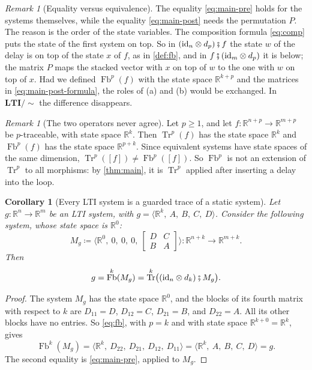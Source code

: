 \documentclass[11pt,a4paper]{article}
\theoremstyle{plain}
\newtheorem{corollary}[theorem]{Corollary}
\theoremstyle{definition}
\theoremstyle{remark}
\newtheorem{remark}[theorem]{Remark}
\DeclareMathOperator{\Fb}{Fb}
\DeclareMathOperator{\Tr}{Tr}
\newcommand{\R}{\mathbb{R}}
\newcommand{\id}{\mathrm{id}}
\newcommand{\then}{\mathbin{\fatsemi}}
\newcommand{\LTIq}{\mathbf{LTI}/{\sim}}
\newcommand{\sys}[5]{\bigl\langle #1,\ #2,\ #3,\ #4,\ #5 \bigr\rangle}
\begin{document}
\begin{remark}[Equality versus equivalence]
    The equality \cref{eq:main-pre} holds for the systems themselves, while the equality \cref{eq:main-post} needs the permutation $P$.
    The reason is the order of the state variables.
    The composition formula \cref{eq:comp} puts the state of the first system on top.
    So in $(\id_n \otimes d_p) \then f$ the state $w$ of the delay is on top of the state $x$ of $f$, as in \cref{def:fb}, and in $f \then (\id_m \otimes d_p)$ it is below; the matrix $P$ maps the stacked vector with $x$ on top of $w$ to the one with $w$ on top of $x$.
    Had we defined $\Fb^p(f)$ with the state space $\R^{k+p}$ and the matrices in \cref{eq:main-post-formula}, the roles of (a) and (b) would be exchanged.
    In $\LTIq$ the difference disappears.
\end{remark}

\begin{remark}[The two operators never agree]
    Let $p \geq 1$, and let $f \colon \R^{n+p} \to \R^{m+p}$ be $p$-traceable, with state space $\R^k$.
    Then $\Tr^p(f)$ has the state space $\R^k$ and $\Fb^p(f)$ has the state space $\R^{p+k}$.
    Since equivalent systems have state spaces of the same dimension, $\Tr^p([f]) \neq \Fb^p([f])$.
    So $\Fb^p$ is not an extension of $\Tr^p$ to all morphisms: by \cref{thm:main}, it is $\Tr^p$ applied after inserting a delay into the loop.
\end{remark}

\begin{corollary}[Every LTI system is a guarded trace of a static system]
    \label{cor:static}
    Let $g \colon \R^n \to \R^m$ be an LTI system, with $g = \sys{\R^k}{A}{B}{C}{D}$.
    Consider the following system, whose state space is $\R^0$:
    \begin{equation}
        M_g \coloneqq \sys{\R^0}{0}{0}{0}{\begin{bmatrix} D & C \\ B & A \end{bmatrix}} \colon \R^{n+k} \to \R^{m+k} .
    \end{equation}
    Then
    \begin{equation}
        g = \Fb^k(M_g) = \Tr^k\bigl( (\id_n \otimes d_k) \then M_g \bigr) .
    \end{equation}
\end{corollary}

\begin{proof}
    The system $M_g$ has the state space $\R^0$, and the blocks of its fourth matrix with respect to $k$ are $D_{11} = D$, $D_{12} = C$, $D_{21} = B$, and $D_{22} = A$.
    All its other blocks have no entries.
    So \cref{eq:fb}, with $p = k$ and with state space $\R^{k+0} = \R^k$, gives
    \begin{equation*}
        \Fb^k(M_g) = \sys{\R^k}{D_{22}}{D_{21}}{D_{12}}{D_{11}} = \sys{\R^k}{A}{B}{C}{D} = g .
    \end{equation*}
    The second equality is \cref{eq:main-pre}, applied to $M_g$.
\end{proof}
\end{document}
